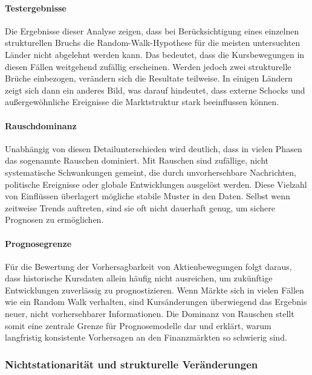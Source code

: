 \paragraph{Testergebnisse}
Die Ergebnisse dieser Analyse zeigen, dass bei Berücksichtigung eines einzelnen strukturellen Bruchs die Random-Walk-Hypothese für die meisten untersuchten Länder nicht abgelehnt werden kann. Das bedeutet, dass die Kursbewegungen in diesen Fällen weitgehend zufällig erscheinen. Werden jedoch zwei strukturelle Brüche einbezogen, verändern sich die Resultate teilweise. In einigen Ländern zeigt sich dann ein anderes Bild, was darauf hindeutet, dass externe Schocks und außergewöhnliche Ereignisse die Marktstruktur stark beeinflussen können.
\paragraph{Rauschdominanz}
Unabhängig von diesen Detailunterschieden wird deutlich, dass in vielen Phasen das sogenannte Rauschen dominiert. Mit Rauschen sind zufällige, nicht systematische Schwankungen gemeint, die durch unvorhersehbare Nachrichten, politische Ereignisse oder globale Entwicklungen ausgelöst werden. Diese Vielzahl von Einflüssen überlagert mögliche stabile Muster in den Daten. Selbst wenn zeitweise Trends auftreten, sind sie oft nicht dauerhaft genug, um sichere Prognosen zu ermöglichen.
\paragraph{Prognosegrenze}
Für die Bewertung der Vorhersagbarkeit von Aktienbewegungen folgt daraus, dass historische Kursdaten allein häufig nicht ausreichen, um zukünftige Entwicklungen zuverlässig zu prognostizieren. Wenn Märkte sich in vielen Fällen wie ein Random Walk verhalten, sind Kursänderungen überwiegend das Ergebnis neuer, nicht vorhersehbarer Informationen. Die Dominanz von Rauschen stellt somit eine zentrale Grenze für Prognosemodelle dar und erklärt, warum langfristig konsistente Vorhersagen an den Finanzmärkten so schwierig sind. \cite{MPRA}

\subsubsection{Nichtstationarität und strukturelle Veränderungen}
